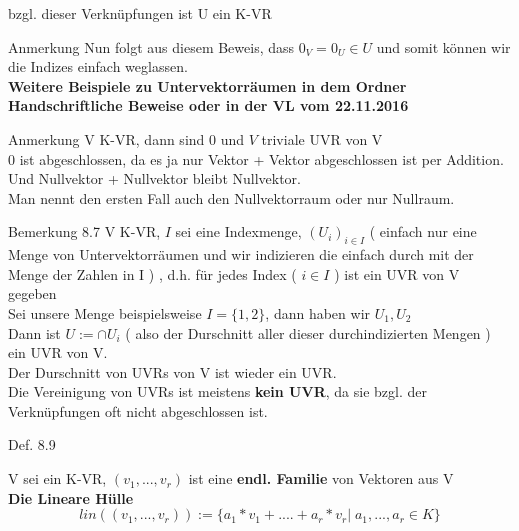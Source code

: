 \documentclass[smallheadings,12pt,a4paper]{scrartcl}
\begin{document}
bzgl. dieser Verknüpfungen ist U ein K-VR \\

\item[Anmerkung]
Nun folgt aus diesem Beweis, dass $0_V = 0_U \in U$ und somit können wir die Indizes einfach weglassen. \\

\textbf{Weitere Beispiele zu Untervektorräumen in dem Ordner Handschriftliche Beweise oder in der VL vom 22.11.2016}

\item[Anmerkung]
V K-VR, dann sind ${0}$ und $V$ triviale UVR von V \\
${0}$ ist abgeschlossen, da es ja nur Vektor + Vektor abgeschlossen ist per Addition. Und Nullvektor + Nullvektor bleibt Nullvektor. \\
Man nennt den ersten Fall auch den Nullvektorraum oder nur Nullraum. \\

\item[Bemerkung 8.7] 
V K-VR, $I$ sei eine Indexmenge, $(U_i)_{i \in I}$ ( einfach nur eine Menge von Untervektorräumen und wir indizieren die einfach durch mit der Menge der Zahlen in I ) , d.h. für jedes Index ( $i \in I $ ) ist ein UVR von V gegeben \\

Sei unsere Menge beispielsweise $I=\{1,2\}$, dann haben wir $U_1,U_2$ \\

Dann ist $ U:= \cap U_i $ ( also der Durschnitt aller dieser durchindizierten Mengen ) ein UVR von V. \\

Der Durschnitt von UVRs von V ist wieder ein UVR. \\

Die Vereinigung von UVRs ist meistens \textbf{kein UVR}, da sie bzgl. der Verknüpfungen oft nicht abgeschlossen ist. \\

\newpage

\begin{center}
\item[Def. 8.9]
\end{center}
\item V sei ein K-VR, $(v_1,...,v_r)$ ist eine \textbf{endl. Familie} von Vektoren aus V  \\

\textbf{Die Lineare Hülle} $$lin((v_1,...,v_r)):=\{a_1*v_1+....+a_r*v_r | \; a_1,...,a_r \in K \}$$
\end{document}

